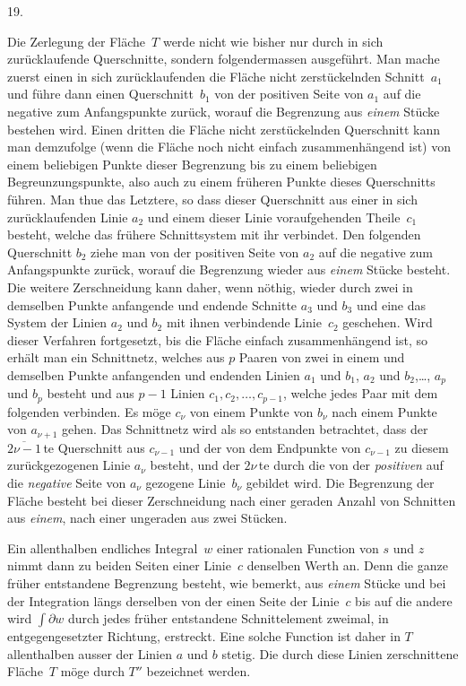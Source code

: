 \documentclass[a4paper,12pt,leqno]{article}
\begin{document}
\medbreak

\centerline{19.}

\nobreak\medskip

Die Zerlegung der Fl\"{a}che~$T$ werde nicht wie bisher nur durch
in sich zur\"{u}cklaufende Querschnitte, sondern folgendermassen
ausgef\"{u}hrt.  Man mache zuerst einen in sich
zur\"{u}cklaufenden die Fl\"{a}che nicht zerst\"{u}ckelnden
Schnitt~$a_1$ und f\"{u}hre dann einen Querschnitt~$b_1$ von der
positiven Seite von $a_1$ auf die negative zum Anfangspunkte
zur\"{u}ck, worauf die Begrenzung aus \emph{einem} St\"{u}cke
bestehen wird.  Einen dritten die Fl\"{a}che nicht
zerst\"{u}ckelnden Querschnitt kann man demzufolge (wenn die
Fl\"{a}che noch nicht einfach zusammenh\"{a}ngend ist) von einem
beliebigen Punkte dieser Begrenzung bis zu einem beliebigen
Begreunzungspunkte, also auch zu einem fr\"{u}heren Punkte dieses
Querschnitts f\"{u}hren.  Man thue das Letztere, so dass dieser
Querschnitt aus einer in sich zur\"{u}cklaufenden Linie $a_2$ und
einem dieser Linie voraufgehenden Theile~$c_1$ besteht, welche das
fr\"{u}here Schnittsystem mit ihr verbindet.  Den folgenden
Querschnitt $b_2$ ziehe man von der positiven Seite von $a_2$ auf
die negative zum Anfangspunkte zur\"{u}ck, worauf die Begrenzung
wieder aus \emph{einem} St\"{u}cke besteht.  Die weitere
Zerschneidung kann daher, wenn n\"{o}thig, wieder durch zwei in
demselben Punkte anfangende und endende Schnitte $a_3$ und $b_3$
und eine das System der Linien $a_2$ und $b_2$ mit ihnen
verbindende Linie~$c_2$ geschehen.  Wird dieser Verfahren
fortgesetzt, bis die Fl\"{a}che einfach zusammenh\"{a}ngend ist,
so erh\"{a}lt man ein Schnittnetz, welches aus $p$ Paaren von
zwei in einem und demselben Punkte anfangenden und endenden
Linien $a_1$ und $b_1$, $a_2$ und $b_2$,\dots, $a_p$ und $b_p$
besteht und aus $p - 1$ Linien $c_1, c_2,\ldots, c_{p-1}$, welche
jedes Paar mit dem folgenden verbinden.  Es m\"{o}ge $c_\nu$ von
einem Punkte von $b_\nu$ nach einem Punkte von $a_{\nu + 1}$
gehen.  Das Schnittnetz wird als so entstanden betrachtet, dass
der $\overline{2\nu - 1} \,$\-te Querschnitt aus $c_{\nu - 1}$ und
der von dem Endpunkte von $c_{\nu - 1}$ zu diesem
zur\"{u}ckgezogenen Linie $a_\nu$ besteht, und der $2\nu \,$\-te
durch die von der \emph{positiven} auf die \emph{negative} Seite
von $a_\nu$ gezogene Linie~$b_\nu$ gebildet wird.  Die Begrenzung
der Fl\"{a}che besteht bei dieser Zerschneidung nach einer
geraden Anzahl von Schnitten aus \emph{einem}, nach einer
ungeraden aus zwei St\"{u}cken.

Ein allenthalben endliches Integral~$w$ einer rationalen Function
von $s$ und $z$ nimmt dann zu beiden Seiten einer Linie~$c$
denselben Werth an.  Denn die ganze fr\"{u}her entstandene
Begrenzung besteht, wie bemerkt, aus \emph{einem} St\"{u}cke und
bei der Integration l\"{a}ngs derselben von der einen Seite der
Linie~$c$ bis auf die andere wird $\int \partial w$ durch jedes
fr\"{u}her entstandene Schnittelement zweimal, in
entgegengesetzter Richtung, erstreckt.  Eine solche Function ist
daher in $T$ allenthalben ausser der Linien $a$ und $b$ stetig.
Die durch diese Linien zerschnittene Fl\"{a}che~$T$ m\"{o}ge
durch $T''$ bezeichnet werden.
\end{document}
